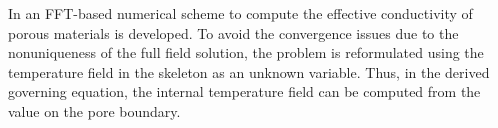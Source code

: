In \cite{to_fft_2020} an FFT-based numerical scheme to compute the effective conductivity of porous materials is developed.
To avoid the convergence issues due to the nonuniqueness of the full field solution, the problem is reformulated using the temperature field in the skeleton as an unknown variable.
Thus, in the derived governing equation, the internal temperature field can be computed from the value on the pore boundary.
